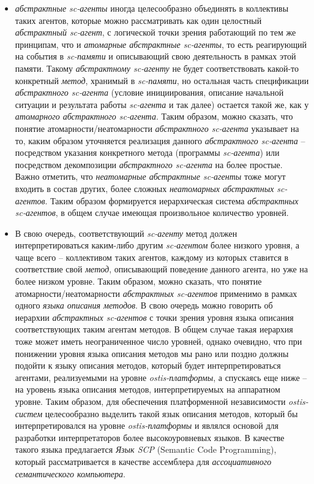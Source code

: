 \begin{SCn}
\begin{scnsubstruct}
\begin{scnsubstruct}
{\begin{itemize}
        \item \textit{абстрактные sc-агенты} иногда целесообразно объединять в коллективы таких агентов, которые можно рассматривать как один целостный \textit{абстрактный sc-агент}, с логической точки зрения работающий по тем же принципам, что и \textit{атомарные абстрактные sc-агенты}, то есть реагирующий на события в \textit{sc-памяти} и описывающий свою деятельность в рамках этой памяти. Такому \textit{абстрактному sc-агенту} не будет соответствовать какой-то конкретный \textit{метод}, хранимый в \textit{sc-памяти}, но остальная часть спецификации \textit{абстрактного sc-агента} (условие инициирования, описание начальной ситуации и результата работы \textit{sc-агента} и так далее) остается такой же, как у \textit{атомарного абстрактного sc-агента}. Таким образом, можно сказать, что понятие атомарности/неатомарности \textit{абстрактного sc-агента} указывает на то, каким образом уточняется реализация данного \textit{абстрактного sc-агента} -- посредством указания конкретного метода (программы \textit{sc-агента}) или посредством декомпозиции \textit{абстрактного sc-агента} на более простые. Важно отметить, что \textit{неатомарные абстрактные sc-агенты} тоже могут входить в состав других, более сложных \textit{неатомарных абстрактных sc-агентов}. Таким образом формируется иерархическая система \textit{абстрактных sc-агентов}, в общем случае имеющая произвольное количество уровней. 
        \item В свою очередь, соответствующий \textit{sc-агенту} метод должен интерпретироваться каким-либо другим \textit{sc-агентом} более низкого уровня, а чаще всего -- коллективом таких агентов, каждому из которых ставится в соответствие свой \textit{метод}, описывающий поведение данного агента, но уже на более низком уровне. Таким образом, можно сказать, что понятие атомарности/неатомарности \textit{абстрактных sc-агентов} применимо в рамках одного \textit{языка описания методов}. В свою очередь можно говорить об иерархии \textit{абстрактных sc-агентов} с точки зрения уровня языка описания соответствующих таким агентам методов. В общем случае такая иерархия тоже может иметь неограниченное число уровней, однако очевидно, что при понижении уровня языка описания методов мы рано или поздно должны подойти к языку описания методов, который будет интерпретироваться агентами, реализуемыми на уровне \textit{ostis-платформы}, а спускаясь еще ниже -- на уровень языка описания методов, интерпретируемых на аппаратном уровне. Таким образом, для обеспечения платформенной независимости \textit{ostis-систем} целесообразно выделить такой язык описания методов, который бы интерпретировался на уровне \textit{ostis-платформы} и являлся основой для разработки интерпретаторов более высокоуровневых языков. В качестве такого языка предлагается \textit{Язык SCP} (Semantic Code Programming), который рассматривается в качестве ассемблера для \textit{ассоциативного семантического компьютера}.

\end{itemize}}
\end{scnsubstruct}
\end{scnsubstruct}
\end{SCn}
